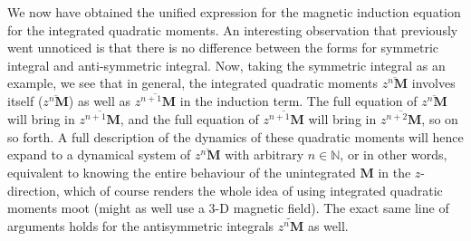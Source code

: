 We now have obtained the unified expression for the magnetic induction equation for the integrated quadratic moments. An interesting observation that previously went unnoticed is that there is no difference between the forms for symmetric integral and anti-symmetric integral. Now, taking the symmetric integral as an example, we see that in general, the integrated quadratic moments $\overline{z^n \mathbf{M}}$ involves itself ($\overline{z^n \mathbf{M}}$) as well as $\overline{z^{n+1} \mathbf{M}}$ in the induction term. The full equation of $\overline{z^n \mathbf{M}}$ will bring in $\overline{z^{n+1} \mathbf{M}}$, and the full equation of $\overline{z^{n+1} \mathbf{M}}$ will bring in $\overline{z^{n+2} \mathbf{M}}$, so on so forth. A full description of the dynamics of these quadratic moments will hence expand to a dynamical system of $\overline{z^n \mathbf{M}}$ with arbitrary $n\in\mathbb{N}$, or in other words, equivalent to knowing the entire behaviour of the unintegrated $\mathbf{M}$ in the $z$-direction, which of course renders the whole idea of using integrated quadratic moments moot (might as well use a 3-D magnetic field). The exact same line of arguments holds for the antisymmetric integrals $\widetilde{z^n \mathbf{M}}$ as well. 

